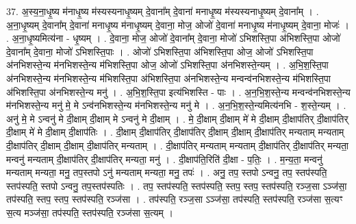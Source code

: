 \documentclass[17pt]{extarticle}
\begin{document}
37. अ॒स्य॒ना॒धृ॒ष्य म॑नाधृ॒ष्य म॑स्यस्यनाधृ॒ष्यम् दे॒वाना᳚म् दे॒वाना॑ मनाधृ॒ष्य म॑स्यस्यनाधृ॒ष्यम् दे॒वाना᳚म् । . अ॒ना॒धृ॒ष्यम् दे॒वाना᳚म् दे॒वाना॑ मनाधृ॒ष्य म॑नाधृ॒ष्यम् दे॒वाना॒ मोज॒ ओजो॑ दे॒वाना॑ मनाधृ॒ष्य म॑नाधृ॒ष्यम् दे॒वाना॒ मोजः॑ । . अ॒ना॒धृ॒ष्यमित्य॑ना - धृ॒ष्यम् । . दे॒वाना॒ मोज॒ ओजो॑ दे॒वाना᳚म् दे॒वाना॒ मोजो॑ ऽभिशस्ति॒पा अ॑भिशस्ति॒पा ओजो॑ दे॒वाना᳚म् दे॒वाना॒ मोजो॑ ऽभिशस्ति॒पाः । . ओजो॑ ऽभिशस्ति॒पा अ॑भिशस्ति॒पा ओज॒ ओजो॑ ऽभिशस्ति॒पा अ॑नभिशस्ते॒न्य म॑नभिशस्ते॒न्य म॑भिशस्ति॒पा ओज॒ ओजो॑ ऽभिशस्ति॒पा अ॑नभिशस्ते॒न्यम् । . अ॒भि॒श॒स्ति॒पा अ॑नभिशस्ते॒न्य म॑नभिशस्ते॒न्य म॑भिशस्ति॒पा अ॑भिशस्ति॒पा अ॑नभिशस्ते॒न्य मन्वन्व॑नभिशस्ते॒न्य म॑भिशस्ति॒पा अ॑भिशस्ति॒पा अ॑नभिशस्ते॒न्य मनु॑ । . अ॒भि॒श॒स्ति॒पा इत्य॑भिशस्ति - पाः । . अ॒न॒भि॒श॒स्ते॒न्य मन्वन्व॑नभिशस्ते॒न्य म॑नभिशस्ते॒न्य मनु॑ मे॒ मे ऽन्व॑नभिशस्ते॒न्य म॑नभिशस्ते॒न्य मनु॑ मे । . अ॒न॒भि॒श॒स्ते॒न्यमित्य॑नभि - श॒स्ते॒न्यम् । . अनु॑ मे॒ मे ऽन्वनु॑ मे दी॒क्षाम् दी॒क्षाम् मे ऽन्वनु॑ मे दी॒क्षाम् । . मे॒ दी॒क्षाम् दी॒क्षाम् मे॑ मे दी॒क्षाम् दी॒क्षाप॑तिर् दी॒क्षाप॑तिर् दी॒क्षाम् मे॑ मे दी॒क्षाम् दी॒क्षाप॑तिः । . दी॒क्षाम् दी॒क्षाप॑तिर् दी॒क्षाप॑तिर् दी॒क्षाम् दी॒क्षाम् दी॒क्षाप॑तिर् मन्यताम् मन्यताम् दी॒क्षाप॑तिर् दी॒क्षाम् दी॒क्षाम् दी॒क्षाप॑तिर् मन्यताम् । . दी॒क्षाप॑तिर् मन्यताम् मन्यताम् दी॒क्षाप॑तिर् दी॒क्षाप॑तिर् मन्यता॒ मन्वनु॑ मन्यताम् दी॒क्षाप॑तिर् दी॒क्षाप॑तिर् मन्यता॒ मनु॑ । . दी॒क्षाप॑ति॒रिति॑ दी॒क्षा - प॒तिः॒ । . म॒न्य॒ता॒ मन्वनु॑ मन्यताम् मन्यता॒ मनु॒ तप॒स्तपो ऽनु॑ मन्यताम् मन्यता॒ मनु॒ तपः॑ । . अनु॒ तप॒ स्तपो ऽन्वनु॒ तप॒ स्तप॑स्पति॒ स्तप॑स्पति॒ स्तपो ऽन्वनु॒ तप॒स्तप॑स्पतिः । . तप॒ स्तप॑स्पति॒ स्तप॑स्पति॒ स्तप॒ स्तप॒ स्तप॑स्पति॒ रञ्ज॒सा ऽञ्ज॑सा॒ तप॑स्पति॒ स्तप॒ स्तप॒ स्तप॑स्पति॒ रञ्ज॑सा । . तप॑स्पति॒ रञ्ज॒सा ऽञ्ज॑सा॒ तप॑स्पति॒ स्तप॑स्पति॒ रञ्ज॑सा स॒त्यꣳ स॒त्य मञ्ज॑सा॒ तप॑स्पति॒ स्तप॑स्पति॒ रञ्ज॑सा स॒त्यम् । \newline
\end{document}
